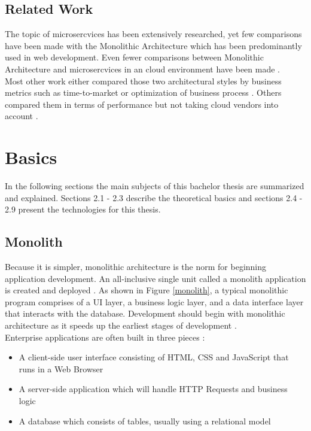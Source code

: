 \documentclass[BIF,Bachelor,nenglish]{twbook}%
\begin{document}
\section{Related Work}
The topic of microsercvices has been extensively researched, yet few comparisons have been made with the Monolithic Architecture which has been predominantly used in web development. Even fewer comparisons between Monolithic Architecture and microsercvices in an cloud environment have been made \cite{vil2015, vil2016}.
\\
Most other work either compared those two architectural styles by business metrics \cite{frommonotomicro} such as time-to-market or optimization of business process \cite{whycompanies}. Others compared them in terms of performance but not taking cloud vendors into account \cite{comp, flygare, compmonomicro}.

\chapter{Basics}
In the following sections the main subjects of this bachelor thesis are summarized and explained. Sections 2.1 - 2.3 describe the theoretical basics and sections 2.4 - 2.9 present the technologies for this thesis.


\section{Monolith}
Because it is simpler, monolithic architecture is the norm for beginning application development. An all-inclusive single unit called a monolith application is created and deployed \cite{comp}. As shown in Figure \ref{monolith}, a typical monolithic program comprises of a \ac{UI} layer, a business logic layer, and a data interface layer that interacts with the database. Development should begin with monolithic architecture as it speeds up the earliest stages of development \cite{chllng}.
\\
Enterprise applications are often built in three pieces \cite{fow2014}:
\begin{itemize}
  \item A client-side user interface consisting of \ac{HTML}, \ac{CSS} and JavaScript that runs in a Web Browser
  \item A server-side application which will handle \ac{HTTP} Requests and business logic
  \item A database which consists of tables, usually using a relational model
\end{itemize}
\end{document}
